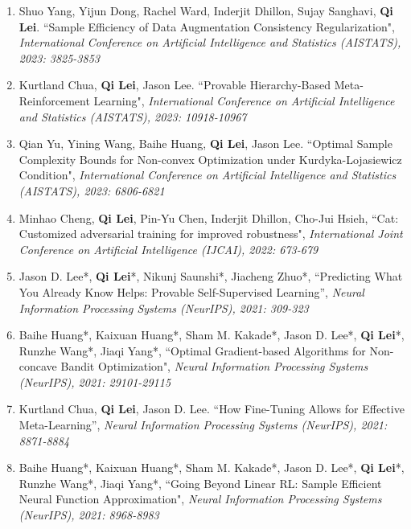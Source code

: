 \documentclass[margin, 10pt]{res} %
\begin{document}
\begin{resume}
\begin{enumerate}
\item{Shuo Yang, Yijun Dong, Rachel Ward, Inderjit Dhillon, Sujay Sanghavi, \textbf{Qi Lei}. ``Sample Efficiency of Data Augmentation Consistency Regularization", \textit{International Conference on
			Artificial Intelligence and Statistics (AISTATS), 2023: 3825-3853}}
	
\item{Kurtland Chua, \textbf{Qi Lei}, Jason Lee. ``Provable Hierarchy-Based Meta-Reinforcement Learning", \textit{International Conference on
		Artificial Intelligence and Statistics (AISTATS), 2023: 10918-10967}}
	
	\item{Qian Yu, Yining Wang, Baihe Huang, \textbf{Qi Lei}, Jason Lee. ``Optimal Sample Complexity Bounds for Non-convex Optimization under Kurdyka-Lojasiewicz Condition", \textit{International Conference on
			Artificial Intelligence and Statistics (AISTATS), 2023: 6806-6821}}
	

	
\item{Minhao Cheng, \textbf{Qi Lei}, Pin-Yu Chen, Inderjit Dhillon, Cho-Jui Hsieh, ``Cat: Customized adversarial training for improved robustness", \textit{International Joint Conference on Artificial Intelligence (IJCAI), 2022: 673-679}}
	
		\item {Jason D. Lee*, \textbf{Qi Lei}*, Nikunj Saunshi*, Jiacheng Zhuo*, ``Predicting What You Already Know Helps: Provable Self-Supervised Learning”, \textit{Neural Information Processing Systems (NeurIPS), 2021: 309-323}}


\item {Baihe Huang*, Kaixuan Huang*, Sham M. Kakade*, Jason D. Lee*, \textbf{Qi Lei}*, Runzhe Wang*, Jiaqi Yang*,  ``Optimal Gradient-based Algorithms for Non-concave Bandit Optimization", 	\textit{Neural Information Processing Systems (NeurIPS), 2021: 29101-29115} }


\item 	{ Kurtland Chua, \textbf{Qi Lei}, Jason D. Lee. ``How Fine-Tuning Allows for Effective Meta-Learning”, \textit{Neural Information Processing Systems (NeurIPS), 2021: 8871-8884} }



\item {Baihe Huang*, Kaixuan Huang*, Sham M. Kakade*, Jason D. Lee*, \textbf{Qi Lei}*, Runzhe Wang*, Jiaqi Yang*, ``Going Beyond Linear RL: Sample Efficient Neural Function Approximation", \textit{Neural Information Processing Systems (NeurIPS), 2021: 8968-8983} }
	

\end{enumerate}
\end{resume}
\end{document}

